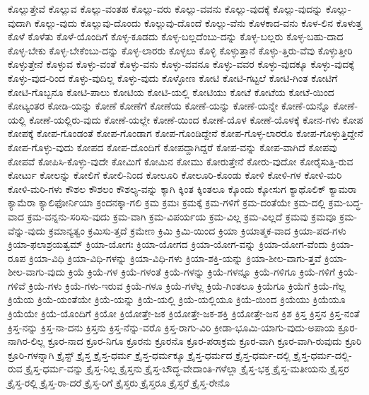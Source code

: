 {ಕೊಲ್ಲುತ್ತೇವೆ
ಕೊಲ್ಲುವ
ಕೊಲ್ಲು-ವಂತಹ
ಕೊಲ್ಲು-ವರು
ಕೊಲ್ಲು-ವವನು
ಕೊಲ್ಲು-ವುದಕ್ಕೆ
ಕೊಲ್ಲು-ವುದನ್ನು
ಕೊಲ್ಲು-ವುದಾಗಿ
ಕೊಲ್ಲು-ವುದು
ಕೊಲ್ಲುವು-ದೊಂದು
ಕೊಲ್ಲುವು-ದೊಂದೆ
ಕೊಲ್ಲು-ವೆನು
ಕೊಳಕಾದ-ವನು
ಕೊಳ-ಲಿನ
ಕೊಳುತ್ತ
ಕೊಳೆ
ಕೊಳೆತು
ಕೊಳೆ-ಯೊಂದಿಗೆ
ಕೊಳ್ಳ-ಕೂಡದು
ಕೊಳ್ಳ-ಬಲ್ಲದೆಂಬು-ದನ್ನು
ಕೊಳ್ಳ-ಬಲ್ಲರು
ಕೊಳ್ಳ-ಬಹು-ದಾದ
ಕೊಳ್ಳ-ಬೇಕು
ಕೊಳ್ಳ-ಬೇಕೆಂಬು-ದನ್ನು
ಕೊಳ್ಳ-ಲಾರರು
ಕೊಳ್ಳಲು
ಕೊಳ್ಳಿ
ಕೊಳ್ಳುತ್ತಾನೆ
ಕೊಳ್ಳು-ತ್ತಿರು-ವೆವು
ಕೊಳ್ಳುತ್ತೀರಿ
ಕೊಳ್ಳುತ್ತೇನೆ
ಕೊಳ್ಳುವ
ಕೊಳ್ಳು-ವಂತೆ
ಕೊಳ್ಳು-ವನು
ಕೊಳ್ಳು-ವವನೂ
ಕೊಳ್ಳು-ವವರ
ಕೊಳ್ಳು-ವುದಕ್ಕೂ
ಕೊಳ್ಳು-ವುದಕ್ಕೆ
ಕೊಳ್ಳು-ವುದ-ರಿಂದ
ಕೊಳ್ಳು-ವುದಿಲ್ಲ
ಕೊಳ್ಳು-ವುದು
ಕೊಳ್ಳೋಣ
ಕೋಟಿ
ಕೋಟಿ-ಗಟ್ಟಲೆ
ಕೋಟಿ-ಗಿಂತ
ಕೋಟಿಗೆ
ಕೋಟಿ-ಗೊಬ್ಬನೂ
ಕೋಟಿ-ಪಾಲು
ಕೋಟಿಯ
ಕೋಟಿ-ಯಲ್ಲಿ
ಕೋಟಿಯು
ಕೋಟೆ
ಕೋಟೆಯ
ಕೋಟೆ-ಯಿಂದ
ಕೋಟ್ಯಂತರ
ಕೋಡಿ-ಯನ್ನು
ಕೋಣೆ
ಕೋಣೆಗೆ
ಕೋಣೆಯ
ಕೋಣೆ-ಯನ್ನು
ಕೋಣೆ-ಯನ್ನೇ
ಕೋಣೆ-ಯನ್ನೊ
ಕೋಣೆ-ಯಲ್ಲಿ
ಕೋಣೆ-ಯಲ್ಲಿರು-ವುದು
ಕೋಣೆ-ಯಲ್ಲೇ
ಕೋಣೆ-ಯಿಂದ
ಕೋಣೆ-ಯೊಳ
ಕೋಣೆ-ಯೊಳಕ್ಕೆ
ಕೋನ-ಗಳು
ಕೋಪ
ಕೋಪಕ್ಕೆ
ಕೋಪ-ಗೊಂಡಂತೆ
ಕೋಪ-ಗೊಂಡಾಗ
ಕೋಪ-ಗೊಂಡಿದ್ದೇನೆ
ಕೋಪ-ಗೊಳ್ಳ-ಲಾರರೊ
ಕೋಪ-ಗೊಳ್ಳುತ್ತಿದ್ದೇನೆ
ಕೋಪ-ಗೊಳ್ಳು-ವುದು
ಕೋಪದ
ಕೋಪ-ದೊಂದಿಗೆ
ಕೋಪದ್ದಾಗಿದ್ದರೆ
ಕೋಪ-ವನ್ನು
ಕೋಪ-ವಾಗಿದೆ
ಕೋಪವು
ಕೋಪವೆ
ಕೋಪಿಸಿ-ಕೊಳ್ಳು-ವುದೇ
ಕೋಮಿಗೆ
ಕೋಮಿನ
ಕೋಮು
ಕೋರುತ್ತೇನೆ
ಕೋರು-ವುದೋ
ಕೋರೈಸುತ್ತಿ-ರುವ
ಕೋರ್ಟು
ಕೋಲನ್ನು
ಕೋಲಿಗೆ
ಕೋಲಿ-ನಿಂದ
ಕೋಲೂರಿ
ಕೋಲೂರಿ-ಕೊಂಡು
ಕೋಳಿ
ಕೋಳಿ-ಗಳ
ಕೋಳಿ-ಮರಿ
ಕೋಳಿ-ಮರಿ-ಗಳು
ಕೌಶಲ
ಕೌಶಲಂ
ಕೌಶಲ್ಯ-ವನ್ನು
ಕ್ಕಾಗಿ
ಕ್ಕಿಂತ
ಕ್ಕಿಂತಲೂ
ಕ್ಕೊಂದು
ಕ್ಕೋಸುಗ
ಕ್ಯಾಥೊಲಿಕ್
ಕ್ಯಾಮರಾ
ಕ್ಯಾಮೆರಾ
ಕ್ಯಾಲಿಫೋರ್ನಿಯಾ
ಕ್ರಂದನಕ್ಕಾ-ಗಲಿ
ಕ್ರಮ
ಕ್ರಮಃ
ಕ್ರಮಕ್ಕೆ
ಕ್ರಮ-ಗಳಿಗೆ
ಕ್ರಮ-ದಂತೆಯೇ
ಕ್ರಮ-ದಲ್ಲಿ
ಕ್ರಮ-ಬದ್ಧ-ವಾದ
ಕ್ರಮ-ವನ್ನನು-ಸರಿಸು-ವುದು
ಕ್ರಮ-ವಾಗಿ
ಕ್ರಮ-ವಿಪರ್ಯಯ
ಕ್ರಮ-ವಿಲ್ಲ
ಕ್ರಮ-ವಿಲ್ಲದೆ
ಕ್ರಮವು
ಕ್ರಮವೂ
ಕ್ರಮ-ವೆನ್ನು-ವುದು
ಕ್ರಮಾನ್ಯತ್ವಂ
ಕ್ರಮಿಸು-ತ್ತದೆ
ಕ್ರಮೇಣ
ಕ್ರಿಮಿ
ಕ್ರಿಮಿ-ಯಿಂದ
ಕ್ರಿಯಾ
ಕ್ರಿಯಾತ್ಮಕ-ವಾದ
ಕ್ರಿಯಾ-ಪದ-ಗಳು
ಕ್ರಿಯಾ-ಫಲಾಶ್ರಯತ್ವಮ್
ಕ್ರಿಯಾ-ಯೋಗಃ
ಕ್ರಿಯಾ-ಯೋಗದ
ಕ್ರಿಯಾ-ಯೋಗ-ವನ್ನು
ಕ್ರಿಯಾ-ಯೋಗ-ವೆಂದು
ಕ್ರಿಯಾ-ರೂಪ
ಕ್ರಿಯಾ-ವಿಧಿ
ಕ್ರಿಯಾ-ವಿಧಿ-ಗಳನ್ನು
ಕ್ರಿಯಾ-ವಿಧಿ-ಗಳು
ಕ್ರಿಯಾ-ಶಕ್ತಿ-ಯನ್ನು
ಕ್ರಿಯಾ-ಶೀಲ-ವಾಗು-ತ್ತವೆ
ಕ್ರಿಯಾ-ಶೀಲ-ವಾಗು-ವುದು
ಕ್ರಿಯೆ
ಕ್ರಿಯೆ-ಗಳ
ಕ್ರಿಯೆ-ಗಳಂತೆ
ಕ್ರಿಯೆ-ಗಳನ್ನು
ಕ್ರಿಯೆ-ಗಳನ್ನೂ
ಕ್ರಿಯೆ-ಗಳಿಗೂ
ಕ್ರಿಯೆ-ಗಳಿಗೆ
ಕ್ರಿಯೆ-ಗಳಿವೆ
ಕ್ರಿಯೆ-ಗಳು
ಕ್ರಿಯೆ-ಗಳು-ಇರುವ
ಕ್ರಿಯೆ-ಗಳೂ
ಕ್ರಿಯೆ-ಗಳೆಲ್ಲ
ಕ್ರಿಯೆ-ಗಿಂತಲೂ
ಕ್ರಿಯೆಗೂ
ಕ್ರಿಯೆಗೆ
ಕ್ರಿಯೆ-ಗೆಲ್ಲ
ಕ್ರಿಯೆಯ
ಕ್ರಿಯೆ-ಯಂತೆಯೇ
ಕ್ರಿಯೆ-ಯನ್ನು
ಕ್ರಿಯೆ-ಯಲ್ಲಿ
ಕ್ರಿಯೆ-ಯಲ್ಲಿಯೂ
ಕ್ರಿಯೆ-ಯಿಂದ
ಕ್ರಿಯೆಯು
ಕ್ರಿಯೆಯೂ
ಕ್ರಿಯೆಯೇ
ಕ್ರಿಯೆ-ಯೊಂದಿಗೆ
ಕ್ರಿಯೋ
ಕ್ರಿಯೋತ್ತೇ-ಜಕ
ಕ್ರಿಯೋತ್ತೇ-ಜಕ-ಶಕ್ತಿ
ಕ್ರಿಯೋತ್ತೇ-ಜನ
ಕ್ರಿಶ
ಕ್ರಿಸ್ತ
ಕ್ರಿಸ್ತನ
ಕ್ರಿಸ್ತ-ನಂತೆ
ಕ್ರಿಸ್ತ-ನನ್ನು
ಕ್ರಿಸ್ತ-ನಾ-ದನು
ಕ್ರಿಸ್ತನು
ಕ್ರಿಸ್ತ-ನೆನ್ನು-ವರೊ
ಕ್ರಿಸ್ತ-ರಾಗು-ವಿರಿ
ಕ್ರೀಡಾ-ಭೂಮಿ-ಯಾಗು-ವುದು-ಅಪಾಯ
ಕ್ರೂರ-ನಾಗಿರ-ಲಿಲ್ಲ
ಕ್ರೂರ-ನಾದ
ಕ್ರೂರ-ನಿಗೂ
ಕ್ರೂರನು
ಕ್ರೂರನೊ
ಕ್ರೂರ-ಪರಾಕ್ರಮ
ಕ್ರೂರ-ವಾಗಿ
ಕ್ರೂರ-ವಾಗಿ-ರುವುದು
ಕ್ರೂರಿ
ಕ್ರೂರಿ-ಗಳನ್ನಾಗಿ
ಕ್ರೈಸ್ಟ್
ಕ್ರೈಸ್ತ
ಕ್ರೈಸ್ತ-ಧರ್ಮ
ಕ್ರೈಸ್ತ-ಧರ್ಮಕ್ಕೂ
ಕ್ರೈಸ್ತ-ಧರ್ಮದ
ಕ್ರೈಸ್ತ-ಧರ್ಮ-ದಲ್ಲಿ
ಕ್ರೈಸ್ತ-ಧರ್ಮ-ದಲ್ಲಿ-ರುವ
ಕ್ರೈಸ್ತ-ಧರ್ಮ-ವನ್ನು
ಕ್ರೈಸ್ತ-ನಿಲ್ಲ
ಕ್ರೈಸ್ತನು
ಕ್ರೈಸ್ತ-ಬೌದ್ಧ-ವೇದಾಂತಿ-ಗಳೆಲ್ಲಾ
ಕ್ರೈಸ್ತ-ಭಕ್ತ
ಕ್ರೈಸ್ತ-ಮತೀಯನು
ಕ್ರೈಸ್ತರ
ಕ್ರೈಸ್ತ-ರಲ್ಲಿ
ಕ್ರೈಸ್ತ-ರಾ-ದರೆ
ಕ್ರೈಸ್ತ-ರಿಗೆ
ಕ್ರೈಸ್ತರು
ಕ್ರೈಸ್ತರೂ
ಕ್ರೈಸ್ತರೆ
ಕ್ರೈಸ್ತ-ರೇನೊ
}
